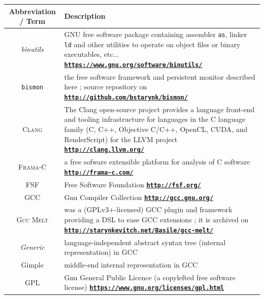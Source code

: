 \documentclass[11pt,a4paper,svgnames]{article}
\newcommand{\bmurl}[1]{{\href{#1}{\texttt{\textbf{#1}}}}}
\begin{document}
\smallskip

\begin{tabular}{|c|p{}|}
  \hline
  \begin{minipage}{0.15\textwidth}

    \smallskip
    
    \textbf{Abbreviation / Term}

    \smallskip
    
  \end{minipage} & \textbf{Description} \\
  \hline \emph{binutils} \index{binutils@\emph{binutils}} & GNU free software package containing assembler \index{as@\texttt{as}} \texttt{as}, linker \texttt{ld} \index{ld@\texttt{ld}} and other utilities to operate on object files or binary executables, etc... \bmurl{https://www.gnu.org/software/binutils/} \\
  \hline \index{bismon@\texttt{bismon}} \texttt{bismon} & the free software framework and persistent monitor described here ; source repository on \bmurl{http://github.com/bstarynk/bismon/} \\
  \hline \textsc{Clang} \index{clang@\textsc{Clang}} & The Clang open-source project provides a language front-end and tooling infrastructure for languages in the C language family (C, C++, Objective C/C++, OpenCL, CUDA, and RenderScript) for the LLVM project \bmurl{http://clang.llvm.org/} \\
  \hline \textsc{Frama-C} \index{Frama-C@\textsc{Frama-C}} &  a free sofware extensible platform for analysis of C software \bmurl{http://frama-c.com/} \\
  \hline FSF & Free Software Foundation \bmurl{http://fsf.org/} \\
  \hline GCC \index{GCC} & Gnu Compiler Collection \bmurl{http://gcc.gnu.org/} \\
  \hline \textsc{Gcc Melt} \index{MELT@\textsc{Melt}} \index{GCC MELT@\textsc{Gcc Melt}} & was a (GPLv3+-licensed) GCC plugin and framework providing a DSL \index{DSL} to ease GCC extensions ; it is archived on \bmurl{http://starynkevitch.net/Basile/gcc-melt/}\\
  \hline \emph{Generic} \index{generic@\emph{Generic}} & language-independent abstract syntax tree (internal representation) in GCC \\
  \hline Gimple \index{gimple@\emph{Gimple}} & middle-end internal representation in GCC \\
  \hline GPL\index{GPL} & Gnu General Public Licence (a copylefted free software license) \bmurl{https://www.gnu.org/licenses/gpl.html} \\

\end{tabular}
\end{document}
